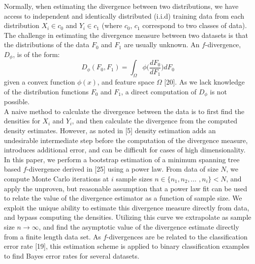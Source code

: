 \documentclass{article}
\begin{document}
	\indent Normally, when estimating the divergence between two distributions, we have access to independent and identically distributed (i.i.d) training data from each distribution $X_i \in c_0$ and $Y_i \in c_1$ (where $c_0$, $c_1$ correspond to two classes of data). The challenge in estimating the divergence measure between two datasets is that the distributions of the data $F_0$ and $F_1$ are usually unknown. An $f$-divergence, $D_\phi$, is of the form: \begin{equation} D_\phi(F_0, F_1) = \int_{\Omega} \phi\bigg(\frac{dF_0}{dF_1}\bigg)dF_0 \end{equation} given a convex function $\phi(x)$, and feature space $\Omega$ [20].
 	As we lack knowledge of the distribution functions $F_0$ and $F_1$, a direct computation of $D_\phi$ is not possible.
 	\\ [0.5ex]
 	
 	\indent A naive method to calculate the divergence between the data is to first find the densities for $X_i$ and $Y_i$, and then calculate the divergence from the computed density estimates. However, as noted in [5] density estimation adds an undesirable intermediate step before the computation of the divergence measure, introduces additional error, and can be difficult for cases of high dimensionality. 
	\\ [0.5ex]
	
	\indent	In this paper, we perform a bootstrap estimation of a minimum spanning tree based $f$-divergence derived in [25] using a power law. From data of size $N$, we compute  Monte Carlo iterations at $i$ sample sizes $n\in \{n_1, n_2,... $ $,n_i\}<N$, and apply the unproven, but reasonable assumption that a power law fit can be used to relate the value of the divergence estimator as a function of sample size. We exploit the unique ability to estimate this divergence measure directly from data, and bypass computing the densities. Utilizing this curve we extrapolate as sample size $n\rightarrow\infty$, and find the asymptotic value of the divergence estimate directly from a finite length data set.  As $f$-divergences are be related to the classification error rate [19], this estimation scheme is applied to binary classification examples to find Bayes error rates for several datasets.
 	\\ [0.5ex]
 	
\end{document}
